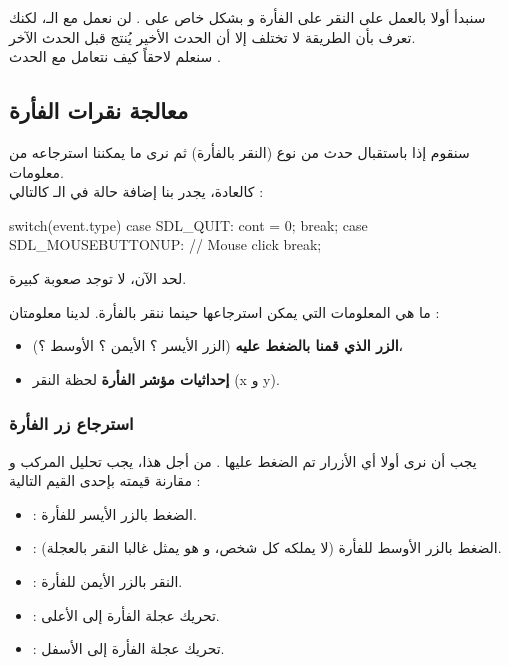 سنبدأ أولا بالعمل على النقر على الفأرة و بشكل خاص على
.
لن نعمل مع الـ،
لكنك تعرف بأن الطريقة لا تختلف إلا أن الحدث الأخير يُنتج قبل الحدث الآخر.\\
سنعلم لاحقاً كيف نتعامل مع الحدث
.

\subsection{معالجة نقرات الفأرة}

سنقوم إذا باستقبال حدث من نوع
(النقر بالفأرة) ثم نرى ما يمكننا استرجاعه من معلومات.\\
كالعادة، يجدر بنا إضافة حالة
في الـ
كالتالي :

\begin{Csource}
switch(event.type)
{
	case SDL_QUIT:
	cont = 0;
	break;
	case SDL_MOUSEBUTTONUP: // Mouse click
	break;
} 
\end{Csource}

لحد الآن، لا توجد صعوبة كبيرة.

ما هي المعلومات التي يمكن استرجاعها حينما ننقر بالفأرة. لدينا معلومتان :

\begin{itemize}
	\item \textbf{الزر الذي قمنا بالضغط عليه}
	 (الزر الأيسر ؟ الأيمن ؟ الأوسط ؟)،
	\item \textbf{إحداثيات مؤشر الفأرة}
	 لحظة النقر 
	(\textenglish{x}
	و
	\textenglish{y}).
\end{itemize}

\subsubsection{استرجاع زر الفأرة}

يجب أن نرى أولا أي الأزرار تم الضغط عليها . من أجل هذا، يجب تحليل المركب
و مقارنة قيمته بإحدى القيم التالية :

\begin{itemize}
	\item {} :
	الضغط بالزر الأيسر للفأرة.
	\item {} :
	الضغط بالزر الأوسط للفأرة (لا يملكه كل شخص، و هو يمثل غالبا النقر بالعجلة).
	\item {} :
	النقر بالزر الأيمن للفأرة.
	\item {} :
	تحريك عجلة الفأرة إلى الأعلى.
	\item {} :
	تحريك عجلة الفأرة إلى الأسفل.
\end{itemize}

